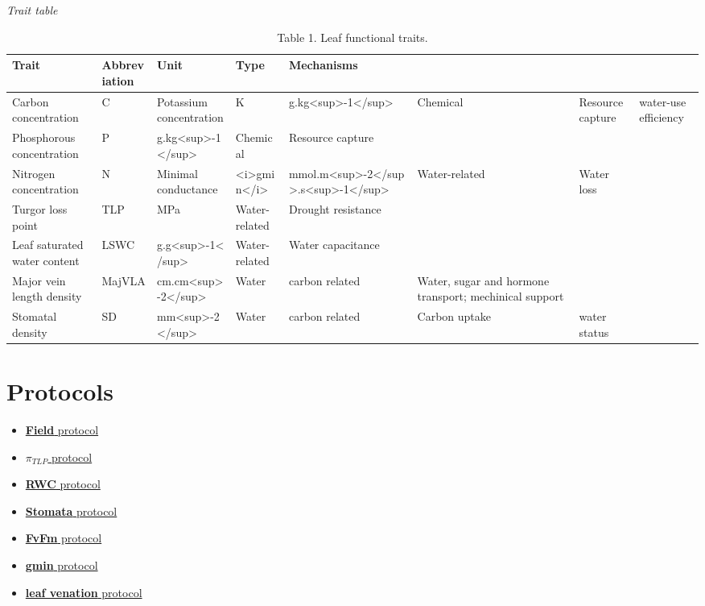 \documentclass[
]{book}
\providecommand{\tightlist}{%
  \setlength{\itemsep}{0pt}\setlength{\parskip}{0pt}}
\begin{document}
\emph{Trait table}

\begin{table}

\caption{\label{tab:unnamed-chunk-2}Table 1. Leaf functional traits.}
\centering
\begin{tabular}[t]{l|l|l|l|l}
\hline
\textbf{Trait} & \textbf{Abbreviation} & \textbf{Unit} & \textbf{Type} & \textbf{Mechanisms}\\
\hline
Carbon concentration & C & %
\hline
Potassium concentration & K & g.kg<sup>-1</sup> & Chemical & Resource capture & water-use efficiency\\
\hline
Phosphorous concentration & P & g.kg<sup>-1</sup> & Chemical & Resource capture\\
\hline
Nitrogen concentration & N & %
\hline
Minimal conductance & <i>gmin</i> & mmol.m<sup>-2</sup>.s<sup>-1</sup> & Water-related & Water loss\\
\hline
Turgor loss point & TLP & MPa & Water-related & Drought resistance\\
\hline
Leaf saturated water content & LSWC & g.g<sup>-1</sup> & Water-related & Water capacitance\\
\hline
Major vein length density & MajVLA & cm.cm<sup>-2</sup> & Water & carbon related & Water, sugar and hormone transport; 
mechinical support\\
\hline
Stomatal density & SD & mm<sup>-2</sup> & Water & carbon related & Carbon uptake & water status\\
\hline
\end{tabular}
\end{table}

\hypertarget{protocols}{%
\section{Protocols}\label{protocols}}

\begin{itemize}
\tightlist
\item
  \href{./Documents/Protocol/Field.Rmd}{\textbf{Field} protocol}
\item
  \href{./Documents/Protocol/Protocole_Ptlp.pdf}{\textbf{\(\pi_{TLP}\)} protocol}
\item
  \href{./Documents/Protocol/RWC_Boisseaux.docx}{\textbf{RWC} protocol}
\item
  \href{./Documents/Protocol/Analyse\%20Stomates_Marion.docx}{\textbf{Stomata} protocol}
\item
  \href{./Documents/Protocol/Fluo_Bellifa.docx}{\textbf{FvFm} protocol}
\item
  \href{./Documents/Protocol/Gmin\%20protocol.docx}{\textbf{gmin} protocol}
\item
  \href{./Documents/Protocol/ProtocolLeafVeins_MB_2.docx}{\textbf{leaf venation} protocol}
\end{itemize}
\end{document}
